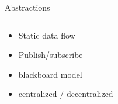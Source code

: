 \documentclass{beamer}
\begin{document}
\begin{frame}{Abstractions}
	\begin{columns}
		\begin{column}{0.6\textwidth}
			\begin{itemize}
				\item Static data flow
                                \item Publish/subscribe
                                \item blackboard model
                                \item centralized / decentralized
			\end{itemize}
		\end{column}
		\begin{column}{0.4\textwidth}
			\centering
		\end{column}
	\end{columns}
\end{frame}



\end{document}
